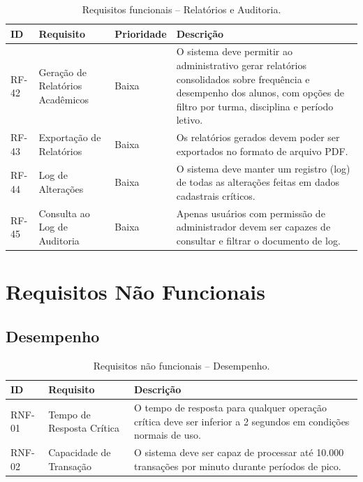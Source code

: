 \begin{table}[H]
\centering
\caption{Requisitos funcionais -- Relatórios e Auditoria.}
\begin{tabularx}{\textwidth}{p{} p{} p{} X}
\toprule
\textbf{ID} & \textbf{Requisito} & \textbf{Prioridade} & \textbf{Descrição} \\
\midrule
RF-42 & Geração de Relatórios Acadêmicos & Baixa & O sistema deve permitir ao administrativo gerar relatórios consolidados sobre frequência e desempenho dos alunos, com opções de filtro por turma, disciplina e período letivo. \\
RF-43 & Exportação de Relatórios & Baixa & Os relatórios gerados devem poder ser exportados no formato de arquivo PDF. \\
RF-44 & Log de Alterações & Baixa & O sistema deve manter um registro (log) de todas as alterações feitas em dados cadastrais críticos. \\
RF-45 & Consulta ao Log de Auditoria & Baixa & Apenas usuários com permissão de administrador devem ser capazes de consultar e filtrar o documento de log. \\
\bottomrule
\end{tabularx}
\end{table}

\section{Requisitos Não Funcionais}

\subsection{Desempenho}

\begin{table}[H]
\centering
\caption{Requisitos não funcionais -- Desempenho.}
\begin{tabularx}{\textwidth}{p{} p{} X}
\toprule
\textbf{ID} & \textbf{Requisito} & \textbf{Descrição} \\
\midrule
RNF-01 & Tempo de Resposta Crítica & O tempo de resposta para qualquer operação crítica deve ser inferior a 2 segundos em condições normais de uso. \\
RNF-02 & Capacidade de Transação & O sistema deve ser capaz de processar até 10.000 transações por minuto durante períodos de pico. \\
\bottomrule
\end{tabularx}
\end{table}

